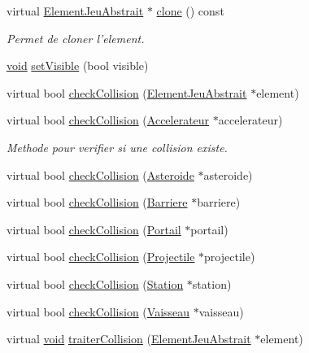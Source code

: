 \begin{DoxyCompactItemize}
virtual \hyperlink{class_element_jeu_abstrait}{Element\-Jeu\-Abstrait} $\ast$ \hyperlink{group___i_n_f2990-04_ga8d1a454a58e20a9dda3d393d2ed02271}{clone} () const 
\begin{DoxyCompactList}\small\item\em Permet de cloner l'element. \end{DoxyCompactList}\item 
\hyperlink{wglew_8h_aeea6e3dfae3acf232096f57d2d57f084}{void} \hyperlink{class_position_depart_ad201a3eeea197734ca05ed4664b802a1}{set\-Visible} (bool visible)
\item 
virtual bool \hyperlink{class_position_depart_aca5a339f043e3021b77708bbcdcb4515}{check\-Collision} (\hyperlink{class_element_jeu_abstrait}{Element\-Jeu\-Abstrait} $\ast$element)
\item 
virtual bool \hyperlink{class_position_depart_a8832154671ceadfa95468cb4225378f4}{check\-Collision} (\hyperlink{class_accelerateur}{Accelerateur} $\ast$accelerateur)
\begin{DoxyCompactList}\small\item\em Methode pour verifier si une collision existe. \end{DoxyCompactList}\item 
virtual bool \hyperlink{class_position_depart_a02fbfc88f4df43df0086141aef83e572}{check\-Collision} (\hyperlink{class_asteroide}{Asteroide} $\ast$asteroide)
\item 
virtual bool \hyperlink{class_position_depart_a3cbaa4bddba08391232bb7c9cd18475d}{check\-Collision} (\hyperlink{class_barriere}{Barriere} $\ast$barriere)
\item 
virtual bool \hyperlink{class_position_depart_adab90619b2e68daf254fd22b194465dd}{check\-Collision} (\hyperlink{class_portail}{Portail} $\ast$portail)
\item 
virtual bool \hyperlink{class_position_depart_a5564b2f52ac4d8d82e568c37ac9cf7c4}{check\-Collision} (\hyperlink{class_projectile}{Projectile} $\ast$projectile)
\item 
virtual bool \hyperlink{class_position_depart_a009f9f677abae1542fcd33fae506fcfe}{check\-Collision} (\hyperlink{class_station}{Station} $\ast$station)
\item 
virtual bool \hyperlink{class_position_depart_a09b672c6476f832182452f371ee2e002}{check\-Collision} (\hyperlink{class_vaisseau}{Vaisseau} $\ast$vaisseau)
\item 
virtual \hyperlink{wglew_8h_aeea6e3dfae3acf232096f57d2d57f084}{void} \hyperlink{class_position_depart_a0675f0c17e1a35da105bdb44cf899b10}{traiter\-Collision} (\hyperlink{class_element_jeu_abstrait}{Element\-Jeu\-Abstrait} $\ast$element)

\end{DoxyCompactItemize}
